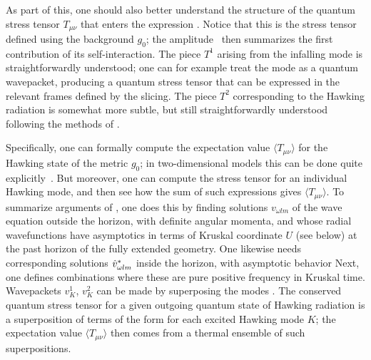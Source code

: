 As part of this, one should also better understand the structure of the quantum stress tensor $T_{\mu\nu}$ that enters the expression \gravpert.  Notice that this is the stress tensor defined using the background $g_0$; the amplitude \treeM\ then summarizes the first contribution of its self-interaction.  The piece $T^1$ arising from the infalling mode is straightforwardly understood; one can for example treat the mode as a quantum wavepacket, producing a quantum stress tensor that can be expressed in the relevant frames defined by the slicing.  The piece $T^2$ corresponding to the Hawking radiation is somewhat more subtle, but still straightforwardly understood following the methods of \SGnonloc.  

Specifically, one can formally compute the expectation value $\langle T_{\mu\nu}\rangle$ for the Hawking state of the metric $g_0$; in two-dimensional models this can be done quite explicitly~.  But moreover, one can compute the stress tensor for an individual Hawking mode, and then see how the sum of such expressions gives $\langle T_{\mu\nu}\rangle$.  To summarize arguments of \SGnonloc, one does this by finding solutions $v_{\omega l m}$ of the wave equation outside the horizon, with definite angular momenta, and whose radial wavefunctions have asymptotics 
%
\eqn{}
%
in terms of Kruskal coordinate $U$ (see below) at the past horizon of the fully extended geometry.  One likewise needs corresponding solutions ${\hat v}_{\omega l m}^*$ inside the horizon, with asymptotic behavior 
%
\eqn{}
%
Next, one defines combinations 
%
\eqn{}
%
where
%
\eqn{}
%
these are pure positive frequency in Kruskal time.  Wavepackets $v^1_K$, $v^2_K$ can be made by superposing the modes \vfd.  The conserved quantum stress tensor for a given outgoing quantum state of Hawking radiation is a superposition of terms of the form
%
\eqn{}
%
for each excited Hawking mode $K$; the expectation value $\langle T_{\mu\nu}\rangle$ then comes from a thermal ensemble of such superpositions.

